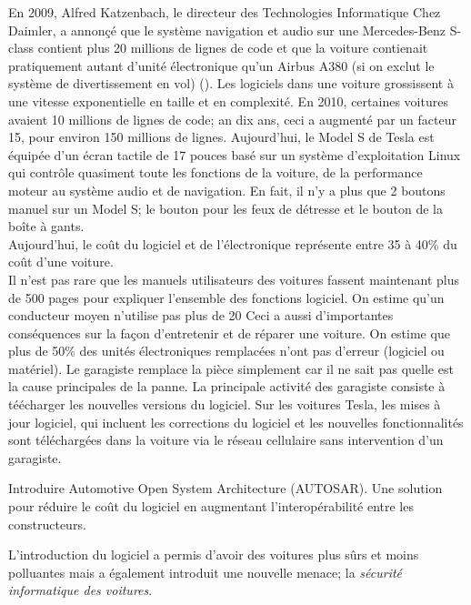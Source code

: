 En 2009, Alfred Katzenbach, le directeur des Technologies Informatique Chez Daimler, a annon\c c\'e
que le syst\`eme navigation et audio sur une Mercedes-Benz  S-class contient plus 20
millions de lignes de code et que la voiture contienait pratiquement autant d'unit\'e \'electronique qu'un Airbus A380 (si on exclut le syst\`eme de divertissement en vol) (\cite{Cha09}).  Les logiciels dans une voiture grossissent \`a une vitesse exponentielle en taille et en complexit\'e. En 2010, certaines voitures avaient 10 millions de lignes de code; an dix ans, ceci a augment\'e par un facteur 15, pour environ 150 millions de lignes. Aujourd'hui, le Model S de Tesla est \'equip\'ee d'un \'ecran tactile de 17 pouces bas\'e sur un syst\`eme d'exploitation Linux qui contr\^ole quasiment toute les fonctions de la voiture, de la performance moteur au syst\`eme audio et de navigation. En fait, il n'y a plus que 2 boutons manuel sur un Model S; le bouton pour les feux de d\'etresse et le bouton de la bo\^ite \`a gants. \\
Aujourd'hui, le co\^ut du logiciel et de l'\'electronique repr\'esente entre 35 \`a 40\% du co\^ut d'une voiture. \\
Il n'est pas rare que les manuels utilisateurs des voitures fassent maintenant plus de 500 pages pour expliquer l'ensemble des fonctions logiciel. On estime qu'un conducteur moyen n'utilise pas plus de 20%
Ceci a aussi d'importantes cons\'equences sur la fa\c con d'entretenir et de r\'eparer une voiture. On estime que plus de 50\% des unit\'es \'electroniques remplac\'ees n'ont pas d'erreur (logiciel ou mat\'eriel). Le garagiste remplace la pi\`ece simplement car il ne sait pas quelle est la cause principales de la panne. La principale activit\'e des garagiste consiste \`a t\'e\'echarger les nouvelles versions du logiciel. Sur les voitures Tesla, les mises \`a jour logiciel, qui incluent les corrections du logiciel et les nouvelles fonctionnalit\'es sont t\'el\'echarg\'ees dans la voiture via le r\'eseau cellulaire sans intervention d'un garagiste.\\  



\begin{tbd}
Introduire Automotive Open System Architecture (AUTOSAR). Une solution pour r\'eduire le co\^ut du logiciel en augmentant l'interop\'erabilit\'e entre les constructeurs.
\end{tbd}


L'introduction du logiciel a permis d'avoir des voitures plus s\^urs et moins polluantes mais a \'egalement introduit une nouvelle menace; la \emph{s\'ecurit\'e informatique des voitures}. 


